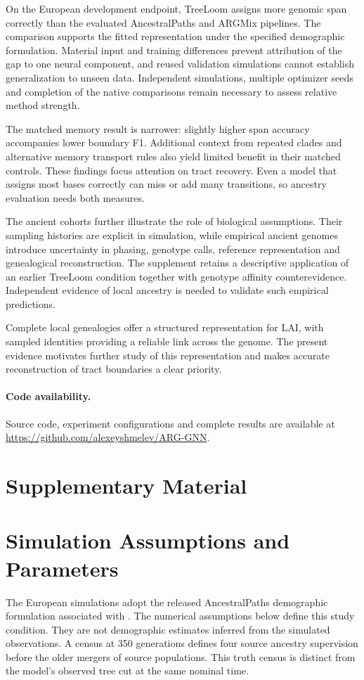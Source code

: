 \documentclass[letterpaper]{article}
\begin{document}
On the European development endpoint, TreeLoom assigns more genomic span correctly than the evaluated AncestralPaths and ARGMix pipelines. The comparison supports the fitted representation under the specified demographic formulation. Material input and training differences prevent attribution of the gap to one neural component, and reused validation simulations cannot establish generalization to unseen data. Independent simulations, multiple optimizer seeds and completion of the native comparisons remain necessary to assess relative method strength.

The matched memory result is narrower: slightly higher span accuracy accompanies lower boundary F1. Additional context from repeated clades and alternative memory transport rules also yield limited benefit in their matched controls. These findings focus attention on tract recovery. Even a model that assigns most bases correctly can miss or add many transitions, so ancestry evaluation needs both measures.

The ancient cohorts further illustrate the role of biological assumptions. Their sampling histories are explicit in simulation, while empirical ancient genomes introduce uncertainty in phasing, genotype calls, reference representation and genealogical reconstruction. The supplement retains a descriptive application of an earlier TreeLoom condition together with genotype affinity counterevidence. Independent evidence of local ancestry is needed to validate such empirical predictions.

Complete local genealogies offer a structured representation for LAI, with sampled identities providing a reliable link across the genome. The present evidence motivates further study of this representation and makes accurate reconstruction of tract boundaries a clear priority.

\paragraph{Code availability.}
Source code, experiment configurations and complete results are available at \url{https://github.com/alexeyshmelev/ARG-GNN}.



\clearpage
\appendix
\section*{Supplementary Material}

\section{Simulation Assumptions and Parameters}
\label{app:simulation}
The European simulations adopt the released AncestralPaths demographic formulation associated with \citet{eurasians2024}. The numerical assumptions below define this study condition. They are not demographic estimates inferred from the simulated observations. A census at 350 generations defines four source ancestry supervision before the older mergers of source populations. This truth census is distinct from the model's observed tree cut at the same nominal time.
\end{document}
